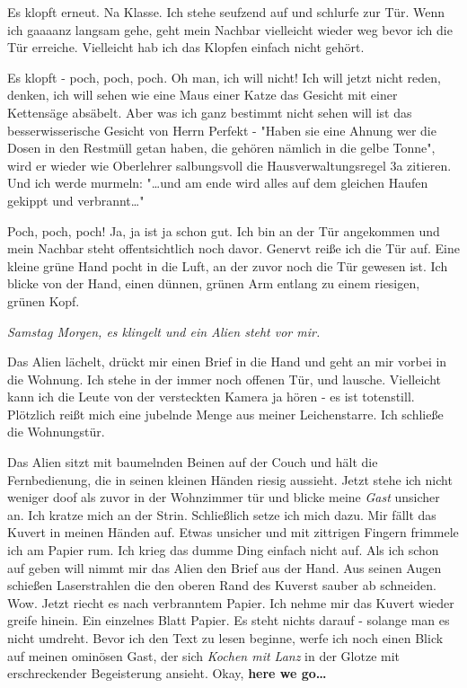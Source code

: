 \documentclass[11pt]{article}
\begin{document}
\noindent  Es klopft erneut. Na Klasse. Ich stehe seufzend auf und 
schlurfe zur Tür. Wenn ich gaaaanz langsam gehe, geht mein
Nachbar vielleicht wieder weg bevor ich die Tür erreiche. 
Vielleicht hab ich das Klopfen einfach nicht gehört.

\noindent Es klopft - poch, poch, poch. Oh man, ich will nicht! Ich
will jetzt nicht reden, denken, ich will sehen wie eine
Maus einer Katze das Gesicht mit einer Kettensäge absäbelt. Aber was 
ich ganz bestimmt nicht sehen will ist das besserwisserische Gesicht
von Herrn Perfekt - "Haben sie eine Ahnung wer die Dosen in den
Restmüll getan haben, die gehören nämlich in die gelbe Tonne", wird er 
wieder wie Oberlehrer salbungsvoll die Hausverwaltungsregel 3a zitieren.
Und ich werde murmeln: "\ldots{}und am ende wird alles auf dem gleichen
Haufen gekippt und verbrannt\ldots{}" 

\noindent Poch, poch, poch! Ja, ja ist ja schon gut. Ich bin an der
Tür angekommen und mein Nachbar steht offentsichtlich noch davor.
Genervt reiße ich die Tür auf. Eine kleine grüne Hand pocht in die
Luft, an der zuvor noch die Tür gewesen ist. Ich blicke von der Hand,
einen dünnen, grünen Arm entlang zu einem riesigen, grünen Kopf. 

\begin{center}
\emph{Samstag Morgen, es klingelt und ein Alien steht vor mir.}
\end{center}

\noindent Das Alien lächelt, drückt mir einen Brief in die Hand und geht an mir
vorbei in die Wohnung. Ich stehe in der immer noch offenen Tür,
und lausche. Vielleicht kann ich die Leute von der versteckten Kamera ja
hören - es ist totenstill. Plötzlich reißt mich eine jubelnde Menge
aus meiner Leichenstarre. Ich schließe die Wohnungstür. 

\noindent Das Alien sitzt mit baumelnden Beinen auf der Couch und hält
die Fernbedienung, die in seinen kleinen Händen riesig aussieht. Jetzt
stehe ich nicht weniger doof als zuvor in der Wohnzimmer tür und
blicke meine \emph{Gast} unsicher an. Ich kratze mich an der
Strin. Schließlich setze ich mich dazu. Mir fällt das Kuvert in meinen
Händen auf. Etwas unsicher und mit zittrigen Fingern frimmele ich am
Papier rum. Ich krieg das dumme Ding einfach nicht auf. Als ich schon
auf geben will nimmt mir das Alien den Brief aus der Hand. Aus seinen
Augen schießen Laserstrahlen die den oberen Rand des Kuverst sauber ab
schneiden. Wow. Jetzt riecht es nach verbranntem Papier. Ich nehme mir
das Kuvert wieder greife hinein. Ein einzelnes Blatt Papier. Es steht
nichts darauf - solange man es nicht umdreht. Bevor ich den Text zu
lesen beginne, werfe ich noch einen Blick auf meinen ominösen Gast, 
der sich \emph{Kochen mit Lanz} in der Glotze mit erschreckender
Begeisterung ansieht. Okay, \textbf{here we go\ldots{}}
\end{document}
